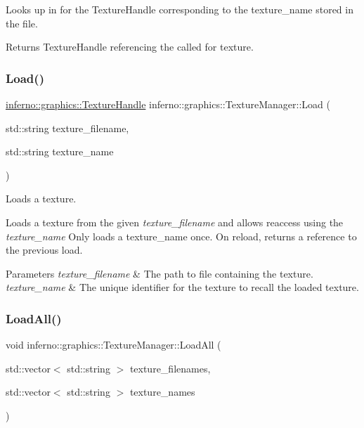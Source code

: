 Looks up in for the Texture\+Handle corresponding to the texture\+\_\+name stored in the file. \begin{DoxyReturn}{Returns}
Texture\+Handle referencing the called for texture. 
\end{DoxyReturn}
\mbox{\label{classinferno_1_1graphics_1_1_texture_manager_a12be034ff8a7782ae575d0a2b71a361d}} 
\subsubsection{\texorpdfstring{Load()}{Load()}}
{\footnotesize\ttfamily \mbox{\hyperlink{namespaceinferno_1_1graphics_a9d719bfbfedd17b9ace9b8d603ab5a38}{inferno\+::graphics\+::\+Texture\+Handle}} inferno\+::graphics\+::\+Texture\+Manager\+::\+Load (\begin{DoxyParamCaption}\item[{std\+::string}]{texture\+\_\+filename,  }\item[{std\+::string}]{texture\+\_\+name }\end{DoxyParamCaption})}



Loads a texture. 

Loads a texture from the given {\itshape texture\+\_\+filename} and allows reaccess using the {\itshape texture\+\_\+name} Only loads a texture\+\_\+name once. On reload, returns a reference to the previous load. 
\begin{DoxyParams}{Parameters}
{\em texture\+\_\+filename} & The path to file containing the texture. \\
\hline
{\em texture\+\_\+name} & The unique identifier for the texture to recall the loaded texture. \\
\hline
\end{DoxyParams}
\mbox{\label{classinferno_1_1graphics_1_1_texture_manager_ae1c0a268b96073bb0c925e3523f2bc58}} 
\subsubsection{\texorpdfstring{Load\+All()}{LoadAll()}}
{\footnotesize\ttfamily void inferno\+::graphics\+::\+Texture\+Manager\+::\+Load\+All (\begin{DoxyParamCaption}\item[{std\+::vector$<$ std\+::string $>$}]{texture\+\_\+filenames,  }\item[{std\+::vector$<$ std\+::string $>$}]{texture\+\_\+names }\end{DoxyParamCaption})}




